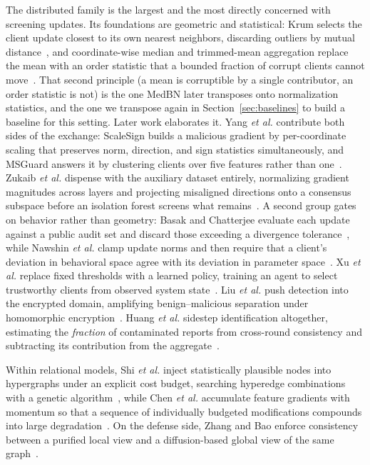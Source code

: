 \documentclass[journal]{IEEEtran}
\begin{document}
The distributed family is the largest and the most directly concerned with screening
updates. Its foundations are geometric and statistical: Krum selects the client
update closest to its own nearest neighbors, discarding outliers by mutual
distance~\cite{blanchard2017krum}, and coordinate-wise median and trimmed-mean
aggregation replace the mean with an order statistic that a bounded fraction of
corrupt clients cannot move~\cite{yin2018trimmed}. That second principle (a mean
is corruptible by a single contributor, an order statistic is not) is the one
MedBN later transposes onto normalization statistics, and the one we transpose again
in Section~\ref{sec:baselines} to build a baseline for this setting. Later work
elaborates it. Yang \emph{et al.} contribute both sides of the exchange: ScaleSign
builds a malicious gradient by per-coordinate scaling that preserves norm,
direction, and sign statistics simultaneously, and MSGuard answers it by clustering
clients over five features rather than one~\cite{yang2025scalesign}. Zukaib
\emph{et al.} dispense with the auxiliary dataset entirely, normalizing gradient
magnitudes across layers and projecting misaligned directions onto a consensus
subspace before an isolation forest screens what remains~\cite{zukaib2026d3flids}. A
second group gates on behavior rather than geometry: Basak and Chatterjee evaluate
each update against a public audit set and discard those exceeding a divergence
tolerance~\cite{basak2025dpad}, while Nawshin \emph{et al.} clamp update norms and
then require that a client's deviation in behavioral space agree with its deviation
in parameter space~\cite{nawshin2026concurrent}. Xu \emph{et al.} replace fixed
thresholds with a learned policy, training an agent to select trustworthy clients
from observed system state~\cite{xu2026feddrlpd}. Liu \emph{et al.} push detection
into the encrypted domain, amplifying benign--malicious separation under homomorphic
encryption~\cite{liu2025antidotefl}. Huang \emph{et al.} sidestep identification
altogether, estimating the \emph{fraction} of contaminated reports from cross-round
consistency and subtracting its contribution from the
aggregate~\cite{huang2024ldpguard}.

Within relational models, Shi \emph{et al.} inject statistically plausible nodes
into hypergraphs under an explicit cost budget, searching hyperedge combinations
with a genetic algorithm~\cite{shi2025h3ni}, while Chen \emph{et al.} accumulate
feature gradients with momentum so that a sequence of individually budgeted
modifications compounds into large degradation~\cite{chen2025mghga}. On the defense
side, Zhang and Bao enforce consistency between a purified local view and a
diffusion-based global view of the same graph~\cite{zhang2025cola}.
\end{document}
